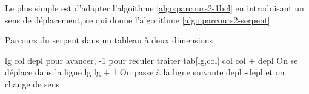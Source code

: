 Le plus simple est d'adapter l'algoithme \vref{algo:parcours2-1bcl}
en introduisant un sens de déplacement, 
ce qui donne l'algorithme \vref{algo:parcours2-serpent}.

\begin{algorithm}[H]
\begin{pseudo}
	\caption{Parcours du serpent dans un tableau à deux dimensions}
	\label{algo:parcours2-serpent}
	\Let lg 
	\Let col 
	\Let depl 	 pour avancer, -1 pour reculer
		\Stmt traiter tab[lg,col]
			\Let col \Gets col + depl \RComment On se déplace dans la ligne
		\Else
			\Let lg \Gets lg + 1	\RComment On passe à la ligne suivante
			\Let depl \Gets -depl	\RComment et on change de sens
		\EndIf
	\EndFor
\end{pseudo}
\end{algorithm}

